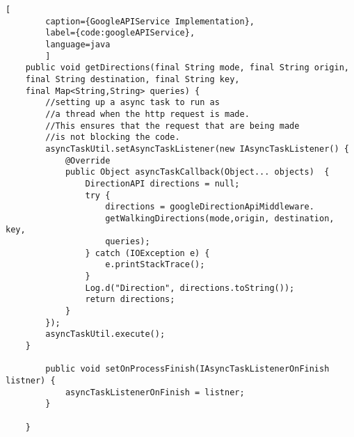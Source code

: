 \begin{lstlisting}[
        caption={GoogleAPIService Implementation},
        label={code:googleAPIService},
        language=java
        ]
    public void getDirections(final String mode, final String origin, 
    final String destination, final String key, 
    final Map<String,String> queries) {
        //setting up a async task to run as 
        //a thread when the http request is made.
        //This ensures that the request that are being made 
        //is not blocking the code.
        asyncTaskUtil.setAsyncTaskListener(new IAsyncTaskListener() {
            @Override
            public Object asyncTaskCallback(Object... objects)  {
                DirectionAPI directions = null;
                try {
                    directions = googleDirectionApiMiddleware.
                    getWalkingDirections(mode,origin, destination, key, 
                    queries);
                } catch (IOException e) {
                    e.printStackTrace();
                }
                Log.d("Direction", directions.toString());
                return directions;
            }
        });
        asyncTaskUtil.execute();
    }

        public void setOnProcessFinish(IAsyncTaskListenerOnFinish listner) {
            asyncTaskListenerOnFinish = listner;
        }

    }
\end{lstlisting}    
